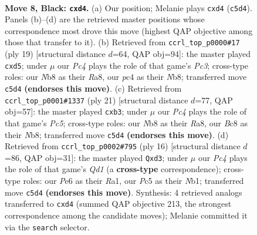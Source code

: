 \documentclass[11pt]{article}
\begin{document}
\begin{figure}[p]\centering
\begin{subfigure}{0.46\textwidth}\centering
\resizebox{\linewidth}{!}{%
\newchessgame
\chessboard[
  setfen={rnb2rk1/pp3ppp/3qpn2/2pp4/2PP4/3BPN2/PP3PPP/RN1QK2R b KQ - 0 8},
  showmover=false,
  pgfstyle=straightmove, color=movearrow, markmove={c5-d4}
]}
\caption{}
\end{subfigure}\hfill
\begin{subfigure}{0.46\textwidth}\centering
\resizebox{\linewidth}{!}{%
\newchessgame
\chessboard[
  setfen={rnb2rk1/pp2qppp/2p1pn2/3P4/3P4/2NBPN2/PPQ2PPP/R3K2R b KQ - 0 10},
  showmover=false,
  pgfstyle=straightmove, color=movearrow, markmove={c6-d5}
]}
\caption{}
\end{subfigure}
\\[4pt]
\begin{subfigure}{0.46\textwidth}\centering
\resizebox{\linewidth}{!}{%
\newchessgame
\chessboard[
  setfen={rnb2rk1/1p3ppp/p2q1n2/3p4/2pP4/1PP2N2/P3BPPP/RN1QR1K1 b - - 0 11},
  showmover=false,
  pgfstyle=straightmove, color=movearrow, markmove={c4-b3}
]}
\caption{}
\end{subfigure}\hfill
\begin{subfigure}{0.46\textwidth}\centering
\resizebox{\linewidth}{!}{%
\newchessgame
\chessboard[
  setfen={rn1qkb1r/pp4pp/2p1ppn1/3pP3/3P4/2Pb1N2/PP3PPP/RNBQ1RK1 w kq - 0 9},
  showmover=false,
  pgfstyle=straightmove, color=movearrow, markmove={d1-d3}
]}
\caption{}
\end{subfigure}
\caption{\textbf{Move 8, Black: \texttt{cxd4}.} (a) Our position; Melanie plays \texttt{cxd4} (\texttt{c5d4}). Panels (b)--(d) are the retrieved master positions whose correspondence most drove this move (highest QAP objective among those that transfer to it). (b) Retrieved from \texttt{ccrl\_top\_p0000\#17} (ply 19) [structural distance $d$=64, QAP obj=94]: the master played \texttt{cxd5}; under $\mu$ our \emph{Pc4} plays the role of that game's \emph{Pc3}; cross-type roles: our \emph{N}b8 as their \emph{R}a8, our \emph{p}c4 as their \emph{N}b8; transferred move \texttt{c5d4} \textbf{(endorses this move)}. (c) Retrieved from \texttt{ccrl\_top\_p0001\#1337} (ply 21) [structural distance $d$=77, QAP obj=57]: the master played \texttt{cxb3}; under $\mu$ our \emph{Pc4} plays the role of that game's \emph{Pc5}; cross-type roles: our \emph{N}b8 as their \emph{R}a8, our \emph{B}c8 as their \emph{N}b8; transferred move \texttt{c5d4} \textbf{(endorses this move)}. (d) Retrieved from \texttt{ccrl\_top\_p0002\#795} (ply 16) [structural distance $d$=86, QAP obj=31]: the master played \texttt{Qxd3}; under $\mu$ our \emph{Pc4} plays the role of that game's \emph{Qd1} (a \textbf{cross-type} correspondence); cross-type roles: our \emph{P}e6 as their \emph{R}a1, our \emph{P}c5 as their \emph{N}b1; transferred move \texttt{c5d4} \textbf{(endorses this move)}. Synthesis: 4 retrieved analogs transferred to \texttt{cxd4} (summed QAP objective 213, the strongest correspondence among the candidate moves); Melanie committed it via the \texttt{search} selector.}
\label{fig:thought-m15}
\end{figure}
\end{document}
